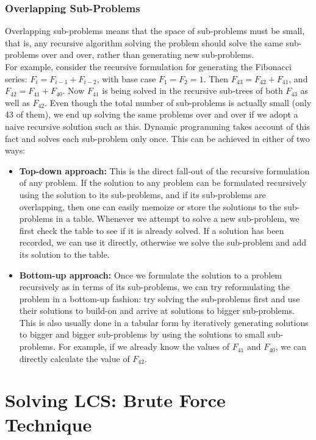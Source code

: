 \documentclass{report}
\begin{document}
    \subsection{Overlapping Sub-Problems}
    \bigskip
    Overlapping sub-problems means that the space of sub-problems must be small, that is, any recursive algorithm solving the problem should solve the same sub-problems over and over, rather than generating new sub-problems.\\
    For example, consider the recursive formulation for generating the Fibonacci series: $F_i = F_{i{-}1} + F_{i{-}2}$, with base case $F_1 = F_2 = 1$. Then $F_{43} = F_{42} + F_{41}$, and $F_{42} = F_{41} + F_{40}$. Now $F_{41}$ is being solved in the recursive sub-trees of both $F_{43}$ as well as $F_{42}$. Even though the total number of sub-problems is actually small (only 43 of them), we end up solving the same problems over and over if we adopt a naive recursive solution such as this. Dynamic programming takes account of this fact and solves each sub-problem only once.
    This can be achieved in either of two ways:
    \bigskip
    \begin{itemize}
        \item {\textbf{Top-down approach:}} This is the direct fall-out of the recursive formulation of any problem. If the solution to any problem can be formulated recursively using the solution to its sub-problems, and if its sub-problems are overlapping, then one can easily memoize or store the solutions to the sub-problems in a table. Whenever we attempt to solve a new sub-problem, we first check the table to see if it is already solved. If a solution has been recorded, we can use it directly, otherwise we solve the sub-problem and add its solution to the table. 
        \bigskip
        \item {\textbf{Bottom-up approach:}} Once we formulate the solution to a problem recursively as in terms of its sub-problems, we can try reformulating the problem in a bottom-up fashion: try solving the sub-problems first and use their solutions to build-on and arrive at solutions to bigger sub-problems. This is also usually done in a tabular form by iteratively generating solutions to bigger and bigger sub-problems by using the solutions to small sub-problems. For example, if we already know the values of $F_{41}$ and $F_{40}$, we can directly calculate the value of $F_{42}$.
    \end{itemize}
    
    \chapter{Solving LCS: Brute Force Technique}
\end{document}
